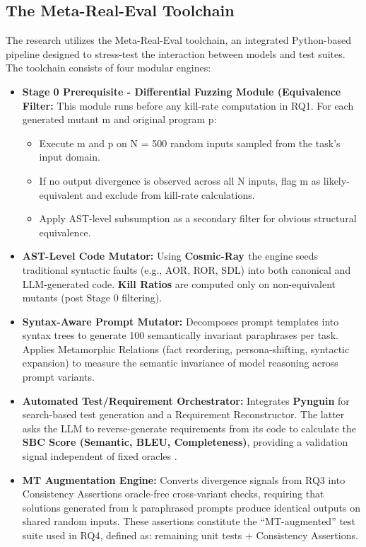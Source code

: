 \documentclass[11pt,a4paper]{article}
\begin{document}
\subsection{The Meta-Real-Eval Toolchain}
 The research utilizes the Meta-Real-Eval toolchain, an integrated Python-based pipeline designed to stress-test the interaction between models and test suites. The toolchain consists of four modular engines:
\begin{itemize}
    \item \textbf{Stage 0 Prerequisite - Differential Fuzzing Module (Equivalence Filter:} This module runs before any kill-rate computation in RQ1. For each generated mutant m and original program p:
    \begin{itemize}[label=$\ast$]  
        \item Execute m and p on N = 500 random inputs sampled from the task’s input domain.
        \item If no output divergence is observed across all N inputs, flag m as likely-equivalent and exclude from kill-rate calculations.
        \item Apply AST-level subsumption as a secondary filter for obvious structural equivalence.
    \end{itemize}
    \item \textbf{AST-Level Code Mutator:} Using \textbf{Cosmic-Ray \cite{cosmicray}} the engine seeds traditional syntactic faults (e.g., AOR, ROR, SDL) into both canonical and LLM-generated code. \textbf{Kill Ratios} are computed only on non-equivalent mutants (post Stage 0 filtering).
    
    \item \textbf{Syntax-Aware Prompt Mutator:} Decomposes prompt templates into syntax trees to generate 100 semantically invariant paraphrases per task. Applies Metamorphic Relations (fact reordering, persona-shifting, syntactic expansion) to measure the semantic invariance of model reasoning across prompt variants. \cite{de2025metamorphic}
    
    \item \textbf{Automated Test/Requirement Orchestrator:} Integrates \textbf{Pynguin} \cite{pynguin} for search-based test generation and a Requirement Reconstructor. The latter asks the LLM to reverse-generate requirements from its code to calculate the \textbf{SBC Score (Semantic, BLEU, Completeness)}, providing a validation signal independent of fixed oracles \cite{asgari2025metamorphic} \cite{ponnusamy2025bridging}.

    \item \textbf{MT Augmentation Engine:} Converts divergence signals from RQ3 into Consistency Assertions oracle-free cross-variant checks, requiring that solutions generated from k paraphrased prompts produce identical outputs on shared random inputs. These assertions constitute the “MT-augmented” test suite used in RQ4, defined as: remaining unit tests + Consistency Assertions.
\end{itemize}    
\end{document}

